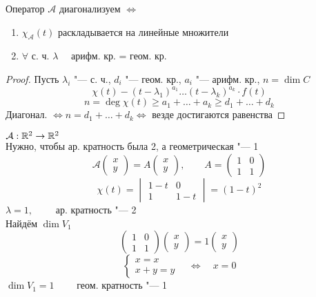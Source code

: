\begin{implication}
	Оператор $ \mathcal{A} $ диагонализуем $ \iff $
	\begin{enumerate}
		\item $ \chi_{\mathcal{A}}(t) $ раскладывается на линейные множители
		\item $ \forall $ с. ч. $ \lambda \quad $ арифм. кр. = геом. кр.
	\end{enumerate}
\end{implication}

\begin{proof}
	Пусть $ \lambda_i $ "--- с. ч., $ d_i $ "--- геом. кр., $ a_i $ "--- арифм. кр., $ n = \dim C $
	$$ \chi(t) - (t - \lambda_1)^{a_1} \dots(t - \lambda_k)^{a_k} \cdot f(t) $$
	$$ n = \deg \chi(t) \ge a_1 + \dots + a_k \ge d_1 + \dots + d_k $$
	Диагонал. $ \iff n = d_1 + \dots + d_k \iff $ везде достигаются равенства
\end{proof}

\begin{eg}
	$ \mathcal{A} : \mathbb{R}^2 \to \mathbb{R}^2 $ \\
	Нужно, чтобы ар. кратность была 2, а геометрическая "--- 1
	$$ \mathcal{A}
	\begin{pmatrix}
		x \\
		y
	\end{pmatrix} = A
	\begin{pmatrix}
		x \\
		y
	\end{pmatrix}, \qquad A =
	\begin{pmatrix}
		1 & 0 \\
		1 & 1
	\end{pmatrix} $$
	$$ \chi(t) =
	\begin{vmatrix}
		1 - t & 0 \\
		1 & 1 - t
	\end{vmatrix} = (1 - t)^2 $$
	$ \lambda = 1, \qquad $ ар. кратность "--- 2 \\
	Найдём $ \dim V_1 $
	$$
	\begin{pmatrix}
		1 & 0 \\
		1 & 1
	\end{pmatrix}
	\begin{pmatrix}
		x \\
		y
	\end{pmatrix} = 1
	\begin{pmatrix}
		x \\
		y
	\end{pmatrix} $$
	$$
	\begin{cases}
		x = x \\
		x + y = y
	\end{cases} \quad \iff \quad x = 0 $$
	$ \dim V_1 = 1 \qquad $ геом. кратность "--- 1
\end{eg}

